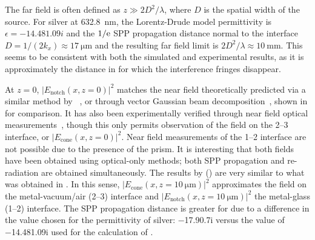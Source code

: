 The far field is often defined as $z\gg 2 D^2/\lambda$, where $D$ is the
spatial width of the source.  For silver at \SI{632.8}{\nano\meter}, the
Lorentz-Drude
model permittivity is $\epsilon = \num{-14.48+1.09i}$ and the $1/{\mathrm{e}}$ SPP
propagation distance normal to the interface $D = 1/(2 k_x) \approx
\SI{17}{\micro\meter}$ and the resulting far field limit is $2 D^2/\lambda
\approx \SI{10}{\milli\meter}$.  This seems to be consistent with both the
simulated and experimental results, as it is approximately the distance in
 for which the interference fringes disappear.

At $z=0$, $|E_\text{notch}(x,z=0)|^2$ matches the near field theoretically
predicted via a similar method by ~\cite{chuang1986lateral}, or
through vector Gaussian beam decomposition~\cite{baida1999theoretical}, shown
in  for comparison.  It has also been experimentally
verified through near field optical measurements~\cite{dawson2001surface},
though this only permits observation of the field on the 2--3 interface, or
$|E_\text{cone}(x,z=0)|^2$.  Near field measurements of the 1--2 interface are
not possible due to the presence of the prism.  It is interesting that both
fields have been obtained using optical-only methods; both SPP propagation and
re-radiation are obtained simultaneously.  The results by 
() are very similar to what was obtained in
.  In this sense,
$|E_\text{cone}(x,z=\SI{10}{\micro\meter})|^2$ approximates the field on the
metal-vacuum/air (2--3) interface and
$|E_\text{notch}(x,z=\SI{10}{\micro\meter})|^2$ the metal-glass (1--2)
interface.  The SPP propagation distance is greater for  due to a
difference in the value chosen for the permittivity of silver:
\num{-17.9+0.7i} versus the value of \num{-14.48+1.09i} used for the
calculation of .

